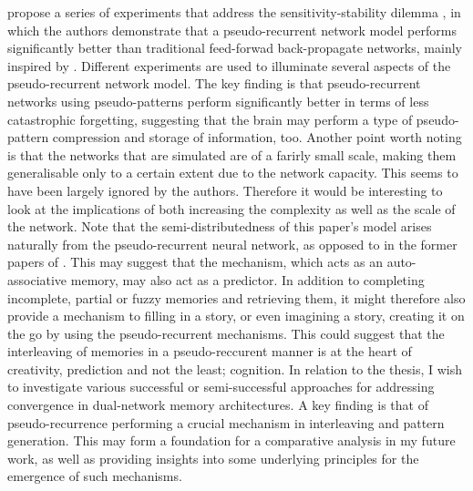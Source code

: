 \citep{French1997} propose a series of experiments that address the sensitivity-stability dilemma \citep{Hebb1949}, in which the authors demonstrate that a pseudo-recurrent network model performs significantly better than traditional feed-forwad back-propagate networks, mainly inspired by \cite{McClelland1995}. Different experiments are used to illuminate several aspects of the pseudo-recurrent network model. The key finding is that pseudo-recurrent networks using pseudo-patterns perform significantly better in terms of less catastrophic forgetting, suggesting that the brain may perform a type of pseudo-pattern compression and storage of information, too. Another point worth noting is that the networks that are simulated are of a farirly small scale, making them generalisable only to a certain extent due to the network capacity. This seems to have been largely ignored by the authors. Therefore it would be interesting to look at the implications of both increasing the complexity as well as the scale of the network. Note that the semi-distributedness of this paper's model arises naturally from the pseudo-recurrent neural network, as opposed to in the former papers of \cite{French1992, French1994}. This may suggest that the mechanism, which acts as an auto-associative memory, may also act as a predictor. In addition to completing incomplete, partial or fuzzy memories and retrieving them, it might therefore also provide a mechanism to filling in a story, or even imagining a story, creating it on the go by using the pseudo-recurrent mechanisms. This could suggest that the interleaving of memories in a pseudo-reccurent manner is at the heart of creativity, prediction and not the least; cognition. In relation to the thesis, I wish to investigate various successful or semi-successful approaches for addressing convergence in dual-network memory architectures. A key finding is that of pseudo-recurrence performing a crucial mechanism in interleaving and pattern generation. This may form a foundation for a comparative analysis in my future work, as well as providing insights into some underlying principles for the emergence of such mechanisms.

